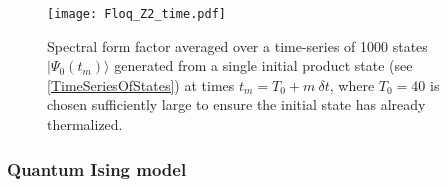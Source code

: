 \documentclass[aps,prb,preprint,onecolumn,amsmath,amssymb,superscriptaddress,eqsecnum,floatfix,scrartcl]{revtex4-1}
\begin{document}
\begin{figure}%
\centering
\texttt{[image: Floq\_Z2\_time.pdf]}
\caption{Spectral form factor averaged over a time-series of 1000 states $|\Psi_0(t_m)\rangle$ generated from a single initial product state
 (see \eqref{TimeSeriesOfStates})
at times $t_m=T_0 + m \  \delta t$, where $T_0=40$ is chosen sufficiently large to ensure the initial state has already thermalized.
}
\label{fig:floq_Z2_time}
\end{figure}

\subsubsection{Quantum Ising model}
\label{SubSectionSpectralFloquetAndQuantumIsingQuantumIsingModel}
\end{document}
